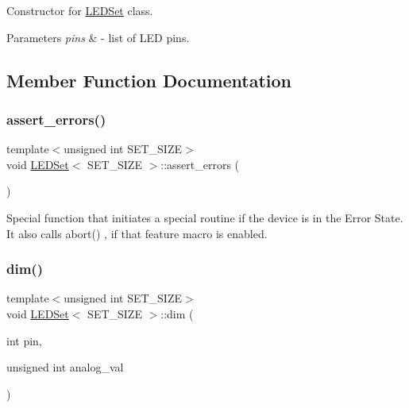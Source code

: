 Constructor for \hyperlink{classLEDSet}{L\+E\+D\+Set} class. 


\begin{DoxyParams}{Parameters}
{\em pins} & -\/ list of L\+ED pins. \\
\hline
\end{DoxyParams}


\subsection{Member Function Documentation}
\mbox{\label{classLEDSet_aafb42531245febe55685c764c29d918f}} 
\subsubsection{\texorpdfstring{assert\+\_\+errors()}{assert\_errors()}}
{\footnotesize\ttfamily template$<$unsigned int S\+E\+T\+\_\+\+S\+I\+ZE$>$ \\
void \hyperlink{classLEDSet}{L\+E\+D\+Set}$<$ S\+E\+T\+\_\+\+S\+I\+ZE $>$\+::assert\+\_\+errors (\begin{DoxyParamCaption}{ }\end{DoxyParamCaption})\hspace{0.3cm}{\ttfamily [inline]}}



Special function that initiates a special routine if the device is in the Error State. It also calls {\ttfamily abort()} , if that feature macro is enabled. 

\mbox{\label{classLEDSet_a8a5ef40584236c3793e4274688eac379}} 
\subsubsection{\texorpdfstring{dim()}{dim()}}
{\footnotesize\ttfamily template$<$unsigned int S\+E\+T\+\_\+\+S\+I\+ZE$>$ \\
void \hyperlink{classLEDSet}{L\+E\+D\+Set}$<$ S\+E\+T\+\_\+\+S\+I\+ZE $>$\+::dim (\begin{DoxyParamCaption}\item[{int}]{pin,  }\item[{unsigned int}]{analog\+\_\+val }\end{DoxyParamCaption})\hspace{0.3cm}{\ttfamily [inline]}}



